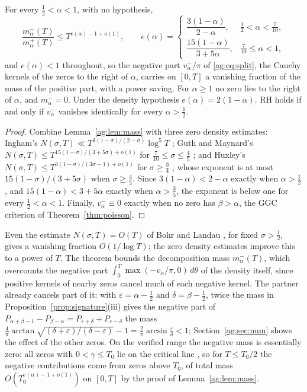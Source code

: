 \begin{theorem}\label{ag:thm:almost}
For every $\frac12<\alpha<1$, with no hypothesis,
\[
\frac{m_\alpha^-(T)}{m_\alpha^+(T)}\le T^{e(\alpha)-1+o(1)},\qquad e(\alpha)=\begin{cases}\dfrac{3(1-\alpha)}{2-\alpha},&\frac12<\alpha<\frac7{10},\\[2ex]\dfrac{15(1-\alpha)}{3+5\alpha},&\frac7{10}\le\alpha<1,\end{cases}
\]
and $e(\alpha)<1$ throughout, so the negative part $v_\alpha^-/\pi$ of \eqref{ag:eq:split}, the Cauchy kernels of the zeros to the right of $\alpha$, carries on $[0,T]$ a vanishing fraction of the mass of the positive part, with a power saving. For $\alpha\ge1$ no zero lies to the right of $\alpha$, and $m_\alpha^-=0$. Under the density hypothesis $e(\alpha)=2(1-\alpha)$. RH holds if and only if $v_\alpha^-$ vanishes identically for every $\alpha>\frac12$.
\end{theorem}

\begin{proof}
Combine Lemma~\ref{ag:lem:mass} with three zero density estimates: Ingham's $N(\sigma,T)\ll T^{3(1-\sigma)/(2-\sigma)}\log^5T$ \cite{Ingham40}; Guth and Maynard's $N(\sigma,T)\le T^{15(1-\sigma)/(3+5\sigma)+o(1)}$ for $\frac7{10}\le\sigma\le\frac45$ \cite[Theorem 1.2]{GM26}; and Huxley's $N(\sigma,T)\le T^{3(1-\sigma)/(3\sigma-1)+o(1)}$ for $\sigma\ge\frac34$ \cite{Huxley72}, whose exponent is at most $15(1-\sigma)/(3+5\sigma)$ when $\sigma\ge\frac45$. Since $3(1-\alpha)<2-\alpha$ exactly when $\alpha>\frac12$, and $15(1-\alpha)<3+5\alpha$ exactly when $\alpha>\frac35$, the exponent is below one for every $\frac12<\alpha<1$. Finally, $v_\alpha^-\equiv0$ exactly when no zero has $\beta>\alpha$, the GGC criterion of Theorem~\ref{thm:poisson}.
\end{proof}

Even the estimate $N(\sigma,T)=O(T)$ of Bohr and Landau \cite{BL14}, for fixed $\sigma>\frac12$, gives a vanishing fraction $O(1/\log T)$; the zero density estimates improve this to a power of $T$. The theorem bounds the decomposition mass $m_\alpha^-(T)$, which overcounts the negative part $\int_0^T\max(-v_\alpha/\pi,0)\,d\theta$ of the density itself, since positive kernels of nearby zeros cancel much of each negative kernel. The partner already cancels part of it: with $\varepsilon=\alpha-\frac12$ and $\delta=\beta-\frac12$, twice the mass in Proposition~\ref{prop:signature}(iii) gives the negative part of $P_{\alpha+\beta-1}-P_{\beta-\alpha}=P_{\varepsilon+\delta}+P_{\varepsilon-\delta}$ the mass $\frac4\pi\arctan\sqrt{(\delta+\varepsilon)/(\delta-\varepsilon)}-1=\frac2\pi\arcsin\frac\varepsilon\delta<1$; Section~\ref{ag:sec:num} shows the effect of the other zeros. On the verified range the negative mass is essentially zero: all zeros with $0<\gamma\le T_0$ lie on the critical line \cite{PT21}, so for $T\le T_0/2$ the negative contributions come from zeros above $T_0$, of total mass $O(T_0^{e(\alpha)-1+o(1)})$ on $[0,T]$ by the proof of Lemma~\ref{ag:lem:mass}.

